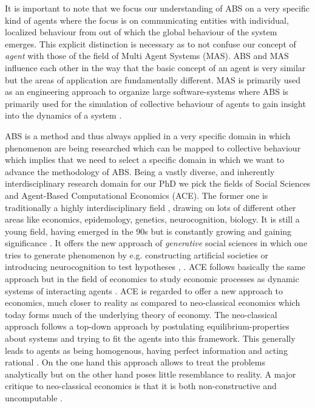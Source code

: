 It is important to note that we focus our understanding of ABS on a very specific kind of agents where the focus is on communicating entities with individual, localized behaviour from out of which the global behaviour of the system emerges. This explicit distinction is necessary as to not confuse our concept of \textit{agent} with those of the field of Multi Agent Systems (MAS). ABS and MAS influence each other in the way that the basic concept of an agent is very similar but the areas of application are fundamentally different. MAS is primarily used as an engineering approach to organize large software-systems \cite{weiss_multiagent_2013} where ABS is primarily used for the simulation of collective behaviour of agents to gain insight into the dynamics of a system \cite{dawson_opening_2014}.

ABS is a method and thus always applied in a very specific domain in which phenomenon are being researched which can be mapped to collective behaviour which implies that we need to select a specific domain in which we want to advance the methodology of ABS. Being a vastly diverse, and inherently interdisciplinary research domain \cite{niazi_agent-based_2011} for our PhD we pick the fields of Social Sciences and Agent-Based Computational Economics (ACE). The former one is traditionally a highly interdisciplinary field \cite{axelrod_chapter_2006}, drawing on lots of different other areas like economics, epidemology, genetics, neurocognition, biology. It is still a young field, having emerged in the 90s but is constantly growing and gaining significance \cite{axelrod_advancing_1997}. It offers the new approach of \textit{generative} social sciences in which one tries to generate phenomenon by e.g. constructing artificial societies or introducing neurocognition to test hypotheses \cite{epstein_growing_1996}, \cite{epstein_agent_zero:_2014}.
ACE follows basically the same approach but in the field of economics to study economic processes as dynamic systems of interacting agents \cite{tesfatsion_agent-based_2006}. ACE is regarded to offer a new approach to economics, much closer to reality as compared to neo-classical economics which today forms much of the underlying theory of economy. The neo-classical approach follows a top-down approach by postulating equilibrium-properties about systems and trying to fit the agents into this framework. This generally leads to agents as being homogenous, having perfect information and acting rational \cite{kirman_complex_2010}. On the one hand this approach allows to treat the problems analytically but on the other hand poses little resemblance to reality. A major critique to neo-classical economics is that it is both non-constructive and uncomputable \cite{velupillai_unreasonable_2005}.
